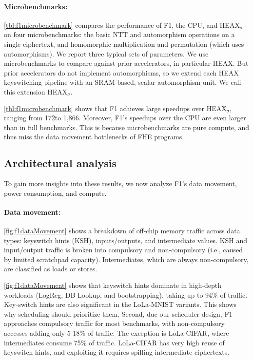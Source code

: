 \paragraph{Microbenchmarks:}
\autoref{tbl:f1microbenchmark} compares the performance of F1, the CPU, and
HEAX$_\sigma$ on four microbenchmarks: the basic NTT and automorphism
operations on a single ciphertext, and homomorphic multiplication and
permutation (which uses automorphisms). We report three typical sets of
parameters. We use microbenchmarks to compare against prior accelerators, in
particular HEAX. But prior accelerators do not implement automorphisms, so we
extend each HEAX keyswitching pipeline with an SRAM-based, scalar automorphism
unit. We call this extension HEAX$_\sigma$.

\autoref{tbl:f1microbenchmark} shows that
F1 achieves large speedups over HEAX$_\sigma$, ranging from 172\x to 1,866\x.
Moreover, F1's speedups over the CPU are even larger than in full benchmarks.
This is because microbenchmarks are pure compute, and thus miss the data
movement bottlenecks of FHE programs.

\subsection{Architectural analysis}

To gain more insights into these results, we now analyze F1's data movement,
power consumption, and compute.

\paragraph{Data movement:}
\autoref{fig:f1dataMovement} shows a breakdown of off-chip memory traffic
across data types: keyswitch hints (KSH), inputs/outputs, and intermediate
values. KSH and input/output traffic is broken into compulsory and
non-compulsory (i.e., caused by limited scratchpad capacity). Intermediates,
which are always non-compulsory, are classified as loads or stores.

\autoref{fig:f1dataMovement} shows that keyswitch hints dominate in high-depth
workloads (LogReg, DB Lookup, and bootstrapping), taking up to 94\% of traffic.
Key-switch hints are also significant in the LoLa-MNIST variants. This shows
why scheduling should prioritize them. Second, due our scheduler design, F1
approaches compulsory traffic for most benchmarks, with non\hyp{}compulsory
accesses adding only 5-18\% of traffic. The exception is LoLa-CIFAR, where
intermediates consume 75\% of traffic. LoLa-CIFAR has very high reuse of
keyswitch hints, and exploiting it requires spilling intermediate ciphertexts.


